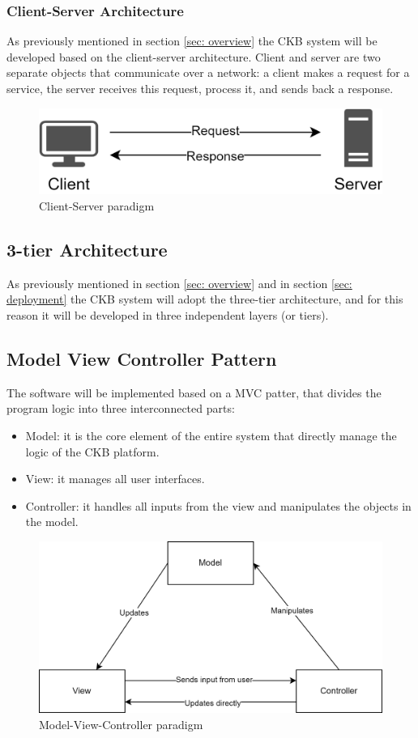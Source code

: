 \subsubsection*{Client-Server Architecture}
As previously mentioned in section \ref{sec: overview} the CKB system will be developed based on the client-server architecture. Client and server are two separate objects that communicate over a network: a client makes a request for a service, the server receives this request, process it, and sends back a response. 
\begin{figure}[h]
    \centering 
    \includegraphics[scale=0.8]{images/CS.png}
    \caption{Client-Server paradigm}
    \label{fig:CS}
\end{figure}

\subsection*{3-tier Architecture}
As previously mentioned in section \ref{sec: overview} and in section \ref{sec: deployment} the CKB system will adopt the three-tier architecture, and for this reason it will be developed in three independent layers (or tiers).

\subsection*{Model View Controller Pattern}
The software will be implemented based on a MVC patter, that divides the program logic into three interconnected parts:
\begin{itemize}
    \item Model: it is the core element of the entire system that directly manage the logic of the CKB platform. 
    \item View: it manages all user interfaces.
    \item Controller: it handles all inputs from the view and manipulates the objects in the model.
\end{itemize}
\begin{figure}[h]
    \centering 
    \includegraphics[scale=0.8]{images/MVC.png}
    \caption{Model-View-Controller paradigm}
    \label{fig:MVC}
\end{figure}

